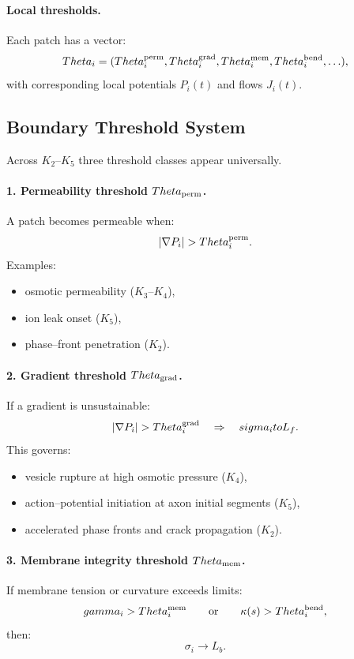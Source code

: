 \paragraph{Local thresholds.}
Each patch has a vector:
\[
  \Theta_i = (\Theta^{\rm perm}_i, \Theta^{\rm grad}_i, \Theta^{\rm mem}_i,
              \Theta^{\rm bend}_i, \ldots ),
\]
with corresponding local potentials \(P_i(t)\) and flows \(J_i(t)\).

\subsection{Boundary Threshold System}

Across \(K_2\)--\(K_5\) three threshold classes appear universally.

\paragraph{1. Permeability threshold \(\Theta_{\rm perm}\).}
A patch becomes permeable when:
\[
  |\nabla P_i| > \Theta^{\rm perm}_i.
\]
Examples:
\begin{itemize}
    \item osmotic permeability (\(K_3\)--\(K_4\)),
    \item ion leak onset (\(K_5\)),
    \item phase–front penetration (\(K_2\)).
\end{itemize}

\paragraph{2. Gradient threshold \(\Theta_{\rm grad}\).}
If a gradient is unsustainable:
\[
  |\nabla P_i| > \Theta^{\rm grad}_i
  \quad\Rightarrow\quad \sigma_i \to L_f.
\]
This governs:
\begin{itemize}
    \item vesicle rupture at high osmotic pressure (\(K_4\)),
    \item action–potential initiation at axon initial segments (\(K_5\)),
    \item accelerated phase fronts and crack propagation (\(K_2\)).
\end{itemize}

\paragraph{3. Membrane integrity threshold \(\Theta_{\rm mem}\).}
If membrane tension or curvature exceeds limits:
\[
  \gamma_i > \Theta^{\rm mem}_i
  \qquad\text{or}\qquad
  \kappa(s) > \Theta^{\rm bend}_i,
\]
then:
\[
  \sigma_i \to L_b.
\]


